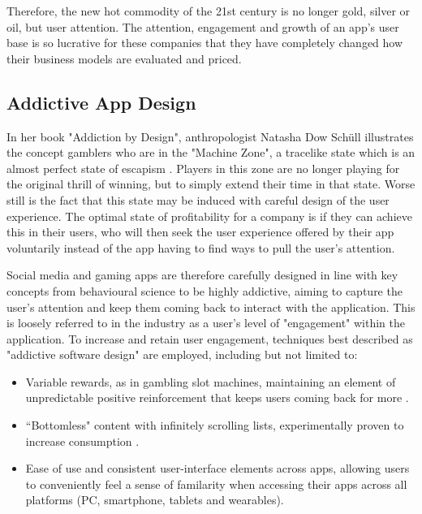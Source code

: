 Therefore, the new hot commodity of the 21st century is no longer gold, silver or oil, but user attention. The attention, engagement and growth of an app's user base is so lucrative for these companies that they have completely changed how their business models are evaluated and priced.

\subsection{Addictive App Design}
In her book "Addiction by Design", anthropologist Natasha Dow Schüll illustrates the concept gamblers who are in the "Machine Zone", a tracelike state which is an almost perfect state of escapism \cite{schull2014addiction}. Players in this zone are no longer playing for the original thrill of winning, but to simply extend their time in that state. Worse still is the fact that this state may be induced with careful design of the user experience. The optimal state of profitability for a company is if they can achieve this in their users, who will then seek the user experience offered by their app voluntarily instead of the app having to find ways to pull the user's attention.

Social media and gaming apps are therefore carefully designed in line with key concepts from behavioural science to be highly addictive, aiming to capture the user's attention and keep them coming back to interact with the application. This is loosely referred to in the industry as a user's level of "engagement" within the application. To increase and retain user engagement, techniques best described as "addictive software design" \cite{neyman2017survey} are employed, including but not limited to:

\begin{itemize}
    \item Variable rewards, as in gambling slot machines, maintaining an element of unpredictable positive reinforcement that keeps users coming back for more \cite{neyman2017survey}.
    \item ``Bottomless" content with infinitely scrolling lists, experimentally proven to increase consumption \cite{neyman2017survey}.
    \item Ease of use and consistent user-interface elements across apps, allowing users to conveniently feel a sense of familarity when accessing their apps across all platforms (PC, smartphone, tablets and wearables).
\end{itemize}

